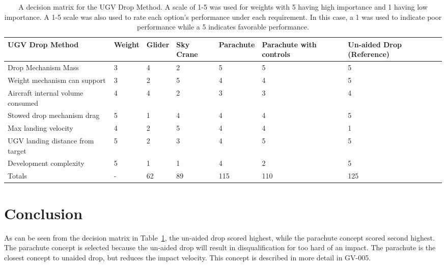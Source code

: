 \documentclass[]{auvsi_doc}
\begin{document}
\begin{table} [H]
\caption{A decision matrix for the UGV Drop Method. A scale of 1-5 was used for weights with 5 having high importance and 1 having low importance. A 1-5 scale was also used to rate each option’s performance under each requirement. In this case, a 1 was used to indicate poor performance while a 5 indicates favorable performance.}
\label{cont_cs_tab}
	\begin{tabular}{|>{\raggedright}p{2.5cm}| l | l | l | l | p{2.5cm} | p{2.5cm} |}
\hline

UGV Drop Method&Weight&Glider&Sky Crane& Parachute& Parachute with controls& Un-aided Drop (Reference) \\
\hline
Drop Mechanism Mass&                                3&4&2&5&5&5 \\
\hline
Weight mechanism can support&                       3&2&5&4&4&5 \\
\hline
Aircraft internal volume consumed&                  4&4&2&3&3&4 \\
\hline
Stowed drop mechanism drag&                         5&1&4&4&4&5 \\
\hline
Max landing velocity&                               4&2&5&4&4&1 \\
\hline
UGV landing distance from target&                   5&2&3&4&5&5 \\
\hline
Development complexity&                             5&1&1&4&2&5 \\
\hline
Totals&                                             -&62&89&115&110&125 \\
\hline

\end{tabular}
\end{table}


\section{Conclusion}
As can be seen from the decision matrix in Table~\ref{cont_cs_tab}, the un-aided drop scored highest, while the parachute concept scored second highest. The parachute concept is selected because the un-aided drop will result in disqualification for too hard of an impact. The parachute is the closest concept to unaided drop, but reduces the impact velocity. This concept is described in more detail in GV-005.
\end{document}
